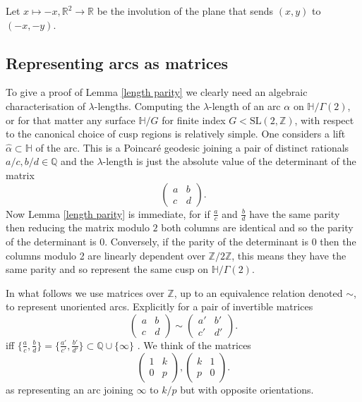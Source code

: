 \documentclass[12pt,a4paper]{amsart}
\def\HH{\mathbb{H}}
\def\g2{\Gamma(2)}
\def\xx{\HH/\g2}
\def\ZZ{\mathbb{Z}}
\def\RR{\mathbb{R}}
\def\sl2{\mathrm{SL}(2, \ZZ)}
\begin{document}
Let $x \mapsto -x, \RR^2 \rightarrow \RR$ 
be the involution of the plane that sends $(x,y)$ to $(-x,-y)$.


\subsection{Representing arcs as matrices}
To give a proof of Lemma \ref{length parity}
we clearly need an algebraic characterisation of $\lambda$-lengths.
Computing the $\lambda$-length of an arc $\alpha$ on $\xx$, or for
that matter any surface $\mathbb{H}/G$ 
for finite index $G <  \sl2$,
with respect to the canonical choice of cusp regions
is relatively simple.
One considers a lift $\hat{\alpha}\subset \mathbb{H}$ of the arc.
This is a Poincaré geodesic joining a pair of distinct rationals
$a/c,b/d \in \mathbb{Q}$ and the $\lambda$-length is just
the absolute value of the determinant of the matrix
$$ 
 \begin{pmatrix} a & b \\ c & d \end{pmatrix}.
$$
Now Lemma \ref{length parity}
is immediate, for if $\frac{a}{c}$ and $\frac{b}{d}$
have the same parity then reducing the 
matrix modulo $2$ both columns are identical
and so the parity of the determinant is $0$.
Conversely, if the parity of the determinant is $0$
then the columns  modulo 2 are linearly dependent over
$\mathbb{Z}/2\mathbb{Z}$,
this means they have the same parity
and so represent the same cusp on $\xx$.

In what follows we use matrices over $\mathbb{Z}$,
up to an equivalence relation denoted $\sim$,
to represent unoriented arcs.
Explicitly  for a pair of invertible matrices 
$$ 
 \begin{pmatrix} a & b \\ c & d \end{pmatrix} \sim
 \begin{pmatrix} a' & b' \\ c' & d' \end{pmatrix}.
$$
iff $\{\frac{a}{c}, \frac{b}{d}\} = \{\frac{a'}{c'}, \frac{b'}{d'}\}
\subset \mathbb{Q}\cup \{\infty\}$
. 
We think of the matrices 
$$
 \begin{pmatrix} 1 & k \\ 0 & p \end{pmatrix},
 \begin{pmatrix} k & 1 \\ p  & 0 \end{pmatrix}.
$$
as representing an arc joining $\infty$ to $k/p$
but with opposite orientations.
\end{document}
